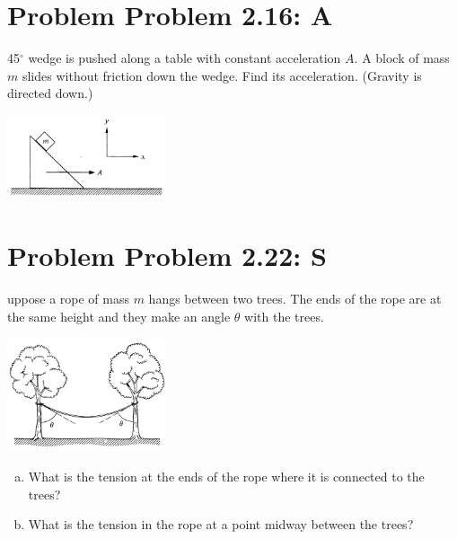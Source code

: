 \documentclass[problems]{esg8012pset}
\begin{document}
\section*{Problem Problem 2.16: A}
 45$^{\circ}$ wedge is pushed along a table with constant acceleration $A$. A block of mass $m$ slides without friction down the wedge. Find its acceleration. (Gravity is directed down.)
  \begin{center}\includegraphics[width=0.35\textwidth]{ps02_4}\end{center}
\section*{Problem Problem 2.22: S}
uppose a rope of mass $m$ hangs between two trees. The ends of the rope are at the same height and they make an angle $\theta$ with the trees.
  \begin{center}\includegraphics[width=0.35\textwidth]{ps02_5}\end{center}
  \begin{enumerate}[a)]
    \item What is the tension at the ends of the rope where it is connected to the trees?
    \item What is the tension in the rope at a point midway between the trees?
  \end{enumerate}
\end{document}
